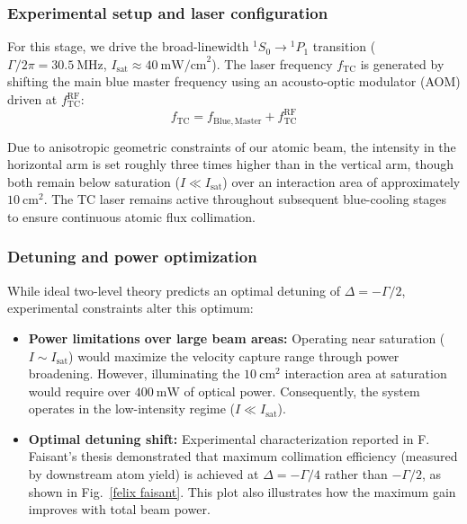 \subsubsection{Experimental setup and laser configuration}

For this stage, we drive the broad-linewidth $^1S_0 \rightarrow {}^1P_1$ transition ($\Gamma / 2\pi = 30.5~\text{MHz}$, $I_{\text{sat}} \approx 40~\text{mW/cm}^2$). The laser frequency $f_{\mathrm{TC}}$ is generated by shifting the main blue master frequency using an acousto-optic modulator (AOM) driven at $f^{\mathrm{RF}}_{\mathrm{TC}}$:
\begin{equation}
f_{\mathrm{TC}} = f_{\mathrm{Blue,Master}} + f^{\mathrm{RF}}_{\mathrm{TC}}
\end{equation}

Due to anisotropic geometric constraints of our atomic beam, the intensity in the horizontal arm is set roughly three times higher than in the vertical arm, though both remain below saturation ($I \ll I_{\text{sat}}$) over an interaction area of approximately $10~\text{cm}^2$. The TC laser remains active throughout subsequent blue-cooling stages to ensure continuous atomic flux collimation.

\subsubsection{Detuning and power optimization}

While ideal two-level theory predicts an optimal detuning of $\Delta = -\Gamma/2$, experimental constraints alter this optimum:
\begin{itemize}
\item \textbf{Power limitations over large beam areas:} Operating near saturation ($I \sim I_{\text{sat}}$) would maximize the velocity capture range through power broadening. However, illuminating the $10~\text{cm}^2$ interaction area at saturation would require over $400~\text{mW}$ of optical power. Consequently, the system operates in the low-intensity regime ($I \ll I_{\text{sat}}$).
\item \textbf{Optimal detuning shift:} Experimental characterization reported in F. Faisant's thesis \cite{faisant_building_2024} demonstrated that maximum collimation efficiency (measured by downstream atom yield) is achieved at $\Delta = -\Gamma/4$ rather than $-\Gamma/2$, as shown in Fig.~\ref{felix faisant}. This plot also illustrates how the maximum gain improves with total beam power.
\end{itemize}

